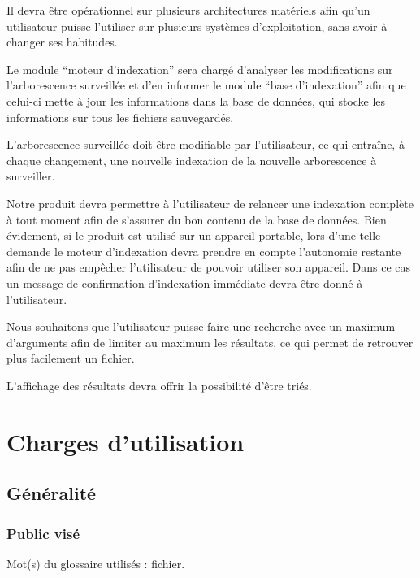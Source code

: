 \documentclass[a4paper,12pt]{report}
\begin{document}
Il devra être opérationnel sur plusieurs architectures matériels afin qu'un utilisateur puisse l'utiliser sur plusieurs systèmes d'exploitation, sans avoir à changer ses habitudes.

Le module \enquote{moteur d'indexation} sera chargé d'analyser les modifications sur l'arborescence surveillée et d'en informer le module \enquote{base d'indexation} afin que celui-ci mette à jour les informations dans la base de données, qui stocke les informations sur tous les fichiers sauvegardés.

L'arborescence surveillée doit être modifiable par l'utilisateur, ce qui entraîne, à chaque changement, une nouvelle indexation de la nouvelle arborescence à surveiller.

Notre produit devra permettre à l'utilisateur de relancer une indexation complète à tout
moment afin de s'assurer du bon contenu de la base de données. Bien évidement, si le
produit est utilisé sur un appareil portable, lors d'une telle demande le moteur d'indexation devra prendre en compte l'autonomie restante afin de ne pas empêcher l'utilisateur de pouvoir utiliser son appareil. Dans ce cas un message de confirmation d'indexation immédiate devra être donné à l'utilisateur.

Nous souhaitons que l'utilisateur puisse faire une recherche avec un maximum d'arguments
afin de limiter au maximum les résultats, ce qui permet de retrouver plus facilement un fichier.

L'affichage des résultats devra offrir la possibilité d'être triés.

\chapter{Charges d'utilisation}

\section{Généralité}

\subsection{Public visé}
Mot(s) du glossaire utilisés : \gls{fichier}.
\end{document}
